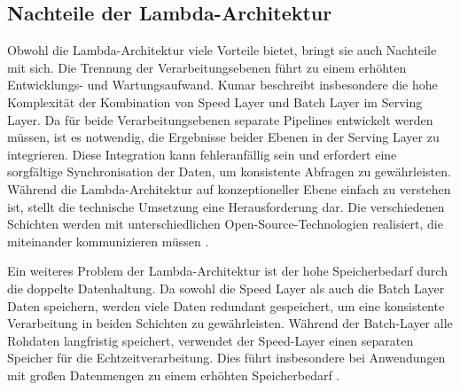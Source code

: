 \subsection{Nachteile der Lambda-Architektur}
Obwohl die Lambda-Architektur viele Vorteile bietet, bringt sie auch Nachteile mit sich. Die Trennung der Verarbeitungsebenen führt zu einem erhöhten Entwicklungs- und Wartungsaufwand. Kumar \cite{kumar2020lambda} beschreibt insbesondere die hohe Komplexität der Kombination von Speed Layer und Batch Layer im Serving Layer. Da für beide Verarbeitungsebenen separate Pipelines entwickelt werden müssen, ist es notwendig, die Ergebnisse beider Ebenen in der Serving Layer zu integrieren. Diese Integration kann fehleranfällig sein und erfordert eine sorgfältige Synchronisation der Daten, um konsistente Abfragen zu gewährleisten. Während die Lambda-Architektur auf konzeptioneller Ebene einfach zu verstehen ist, stellt die technische Umsetzung eine Herausforderung dar. Die verschiedenen Schichten werden mit unterschiedlichen Open-Source-Technologien realisiert, die miteinander kommunizieren müssen \cite{katkar2015study}.

Ein weiteres Problem der Lambda-Architektur ist der hohe Speicherbedarf durch die doppelte Datenhaltung. Da sowohl die Speed Layer als auch die Batch Layer Daten speichern, werden viele Daten redundant gespeichert, um eine konsistente Verarbeitung in beiden Schichten zu gewährleisten. Während der Batch-Layer alle Rohdaten langfristig speichert, verwendet der Speed-Layer einen separaten Speicher für die Echtzeitverarbeitung. Dies führt insbesondere bei Anwendungen mit großen Datenmengen zu einem erhöhten Speicherbedarf \cite{kumar2020lambda}.